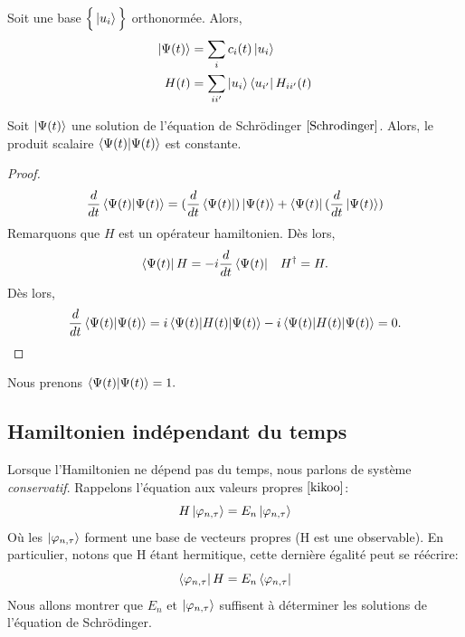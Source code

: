 \documentclass[../notesdecours.tex]{subfiles}
\begin{document}
Soit une base $\Big\{\ket{u_i}\Big\}$ orthonormée. Alors,
\begin{align}
\ket{\Psi(t)} &= \sum_i c_i(t)\ket{u_i}\\
H(t) &= \sum_{i i'} \ket{u_i}\bra{u_{i'}} H_{ii'} (t)
\end{align}

\begin{Property} Soit $\ket{\Psi(t)}$ une solution de l'équation de Schrödinger $\eqref{Schrodinger}$. Alors, le produit scalaire $\braket{\Psi(t)|\Psi(t)}$ est constante. \end{Property}
\begin{proof}
\begin{equation}
\frac{d}{dt} \braket{\Psi(t)|\Psi(t)} = (\frac{d}{dt}\bra{\Psi(t)})\ket{\Psi(t)} + \bra{\Psi(t)}(\frac{d}{dt}\ket{\Psi(t)})
\end{equation}
Remarquons que $H$ est un opérateur hamiltonien. Dès lors,
\begin{align}
\bra{\Psi(t)}H &= -i\frac{d}{dt}\bra{\Psi(t)}		&H^\dag = H.
\end{align}
Dès lors,
\begin{align}
\frac{d}{dt} \braket{\Psi(t)|\Psi(t)} = i \braket{\Psi(t) | H(t) | \Psi(t)} - i \braket{\Psi(t)|H(t)|\Psi(t)} = 0.
\end{align}
\end{proof}

\begin{remark} Nous prenons $\braket{\Psi(t)|\Psi(t)} = 1.$ \end{remark}

\subsection{Hamiltonien indépendant du temps}
Lorsque l'Hamiltonien ne dépend pas du temps, nous parlons de système \emph{conservatif}. Rappelons l'équation aux valeurs propres $\eqref{kikoo}$:
\begin{equation*}
H\ket{\varphi_{n,\tau}} = E_n \ket{\varphi_{n,\tau}}
\end{equation*}
Où les $\ket{\varphi_{n,\tau}}$ forment une base de vecteurs propres (H est une observable). En particulier, notons que H étant hermitique, cette dernière égalité peut se réécrire:
\begin{equation}
\bra{\varphi_{n,\tau}}H = E_n \bra{\varphi_{n,\tau}}
\end{equation}
Nous allons montrer que $E_n$ et $\ket{\varphi_{n,\tau}}$ suffisent à déterminer les solutions de l'équation de Schrödinger.\\
\end{document}

